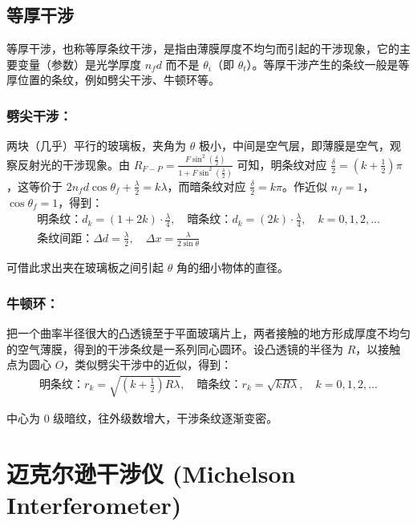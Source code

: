 \documentclass[UTF8]{report}
\theoremstyle{MyLineTheoremStyle} %
\theoremstyle{MyBlockTheoremStyle} %
\theoremstyle{MySubsubsectionStyle} %
\begin{document}
\subsection{等厚干涉} 

等厚干涉，也称等厚条纹干涉，是指由薄膜厚度不均匀而引起的干涉现象，它的主要变量（参数）是光学厚度 $n_f d$ 而不是 $\theta_i$（即 $\theta_t$）。等厚干涉产生的条纹一般是等厚位置的条纹，例如劈尖干涉、牛顿环等。

\subsubsection{劈尖干涉：}

两块（几乎）平行的玻璃板，夹角为 $\theta$ 极小，中间是空气层，即薄膜是空气，观察反射光的干涉现象。由 $R_{F-P} = \frac{ F \sin^2 (\frac{\delta}{2}) }{1 + F \sin^2 (\frac{\delta}{2})}$ 可知，明条纹对应 $\frac{\delta}{2} = (k + \frac{1}{2}) \pi$，这等价于 $2 n_f d\cos \theta_f + \frac{\lambda}{2} = k\lambda$，而暗条纹对应 $\frac{\delta}{2} = k \pi$。作近似 $n_f = 1$，$\cos \theta_f = 1$，得到：
\begin{gather}
    \text{明条纹：} d_k = \left( 1 + 2k \right)\cdot \frac{\lambda}{4},\quad \text{暗条纹：} d_k = \left( 2k \right)\cdot \frac{\lambda}{4},\quad k = 0, 1, 2, ... \\ 
    \text{条纹间距：}\Delta d = \frac{\lambda}{2},\quad \Delta x = \frac{\lambda}{2\sin \theta}
\end{gather}


可借此求出夹在玻璃板之间引起 $\theta$ 角的细小物体的直径。

\subsubsection{牛顿环：}

把一个曲率半径很大的凸透镜至于平面玻璃片上，两者接触的地方形成厚度不均匀的空气薄膜，得到的干涉条纹是一系列同心圆环。设凸透镜的半径为 $R$，以接触点为圆心 $O$，类似劈尖干涉中的近似，得到：
\begin{gather}
\text{明条纹：} r_k = \sqrt{\left(k + \frac{1}{2}\right)R\lambda} 
,\quad 
\text{暗条纹：} r_k = \sqrt{kR\lambda},\quad k = 0, 1, 2, ... 
\end{gather}

中心为 0 级暗纹，往外级数增大，干涉条纹逐渐变密。


\section{迈克尔逊干涉仪 (Michelson Interferometer)}
\end{document}
